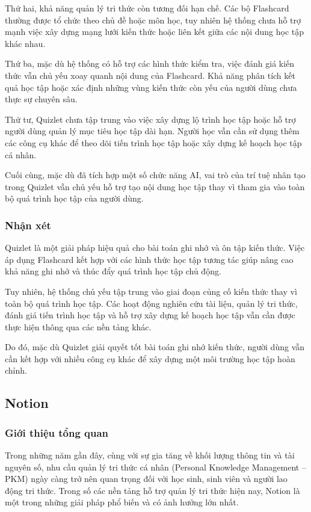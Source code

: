 Thứ hai, khả năng quản lý tri thức còn tương đối hạn chế. Các bộ Flashcard thường được tổ chức theo chủ đề hoặc môn học, tuy nhiên hệ thống chưa hỗ trợ mạnh việc xây dựng mạng lưới kiến thức hoặc liên kết giữa các nội dung học tập khác nhau.

Thứ ba, mặc dù hệ thống có hỗ trợ các hình thức kiểm tra, việc đánh giá kiến thức vẫn chủ yếu xoay quanh nội dung của Flashcard. Khả năng phân tích kết quả học tập hoặc xác định những vùng kiến thức còn yếu của người dùng chưa thực sự chuyên sâu.

Thứ tư, Quizlet chưa tập trung vào việc xây dựng lộ trình học tập hoặc hỗ trợ người dùng quản lý mục tiêu học tập dài hạn. Người học vẫn cần sử dụng thêm các công cụ khác để theo dõi tiến trình học tập hoặc xây dựng kế hoạch học tập cá nhân.

Cuối cùng, mặc dù đã tích hợp một số chức năng AI, vai trò của trí tuệ nhân tạo trong Quizlet vẫn chủ yếu hỗ trợ tạo nội dung học tập thay vì tham gia vào toàn bộ quá trình học tập của người dùng.

\subsubsection{Nhận xét}

Quizlet là một giải pháp hiệu quả cho bài toán ghi nhớ và ôn tập kiến thức. Việc áp dụng Flashcard kết hợp với các hình thức học tập tương tác giúp nâng cao khả năng ghi nhớ và thúc đẩy quá trình học tập chủ động.

Tuy nhiên, hệ thống chủ yếu tập trung vào giai đoạn củng cố kiến thức thay vì toàn bộ quá trình học tập. Các hoạt động nghiên cứu tài liệu, quản lý tri thức, đánh giá tiến trình học tập và hỗ trợ xây dựng kế hoạch học tập vẫn cần được thực hiện thông qua các nền tảng khác.

Do đó, mặc dù Quizlet giải quyết tốt bài toán ghi nhớ kiến thức, người dùng vẫn cần kết hợp với nhiều công cụ khác để xây dựng một môi trường học tập hoàn chỉnh.

\subsection{Notion}
\subsubsection{Giới thiệu tổng quan}

Trong những năm gần đây, cùng với sự gia tăng về khối lượng thông tin và tài nguyên số, nhu cầu quản lý tri thức cá nhân (Personal Knowledge Management – PKM) ngày càng trở nên quan trọng đối với học sinh, sinh viên và người lao động tri thức. Trong số các nền tảng hỗ trợ quản lý tri thức hiện nay, Notion là một trong những giải pháp phổ biến và có ảnh hưởng lớn nhất.

